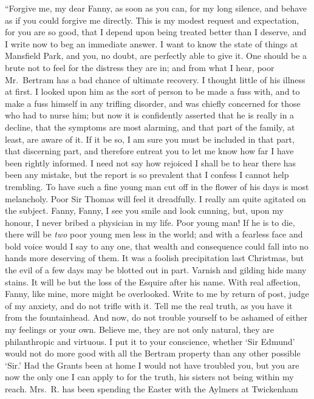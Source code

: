 ``Forgive me, my dear Fanny, as soon as you can, for my
long silence, and behave as if you could forgive me directly.
This is my modest request and expectation, for you are so good,
that I depend upon being treated better than I deserve,
and I write now to beg an immediate answer.  I want to know
the state of things at Mansfield Park, and you, no doubt,
are perfectly able to give it.  One should be a brute not
to feel for the distress they are in; and from what I hear,
poor Mr.\ Bertram has a bad chance of ultimate recovery.
I thought little of his illness at first.  I looked
upon him as the sort of person to be made a fuss with,
and to make a fuss himself in any trifling disorder,
and was chiefly concerned for those who had to nurse him;
but now it is confidently asserted that he is really
in a decline, that the symptoms are most alarming,
and that part of the family, at least, are aware of it.
If it be so, I am sure you must be included in that part,
that discerning part, and therefore entreat you to let
me know how far I have been rightly informed.  I need
not say how rejoiced I shall be to hear there has been
any mistake, but the report is so prevalent that I confess
I cannot help trembling.  To have such a fine young man
cut off in the flower of his days is most melancholy.
Poor Sir Thomas will feel it dreadfully.  I really am quite
agitated on the subject.  Fanny, Fanny, I see you smile
and look cunning, but, upon my honour, I never bribed
a physician in my life.  Poor young man!  If he is to die,
there will be \emph{two} poor young men less in the world;
and with a fearless face and bold voice would I say to any one,
that wealth and consequence could fall into no hands
more deserving of them.  It was a foolish precipitation
last Christmas, but the evil of a few days may be blotted
out in part.  Varnish and gilding hide many stains.
It will be but the loss of the Esquire after his name.
With real affection, Fanny, like mine, more might be overlooked.
Write to me by return of post, judge of my anxiety,
and do not trifle with it.  Tell me the real truth,
as you have it from the fountainhead.  And now, do not
trouble yourself to be ashamed of either my feelings or
your own.  Believe me, they are not only natural, they are
philanthropic and virtuous.  I put it to your conscience,
whether `Sir Edmund' would not do more good with all
the Bertram property than any other possible `Sir.'
Had the Grants been at home I would not have troubled you,
but you are now the only one I can apply to for the truth,
his sisters not being within my reach.  Mrs.\ R. has
been spending the Easter with the Aylmers at Twickenham
